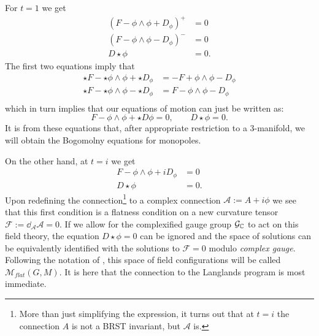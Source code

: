 	For $t = 1$ we get
	\begin{equation}\label{eq:ahat}
		\begin{aligned}
			(F - \phi \wedge \phi + D_\phi)^+ &= 0\\
			(F - \phi \wedge \phi - D_\phi)^- &= 0\\
			D \star \phi &= 0.
		\end{aligned}
	\end{equation}
	The first  two equations imply that
	\[
	\begin{aligned}
		\star F - \star \phi \wedge \phi + \star D_\phi &= - F + \phi \wedge \phi - D_\phi\\
		\star F - \star \phi \wedge \phi - \star D_\phi &= F - \phi \wedge \phi - D_\phi\\
	\end{aligned}		
	\]
	which in turn implies that our equations of motion can just be written as:
	\begin{equation}
		F - \phi \wedge \phi + \star D \phi = 0, \qquad D \star \phi = 0.
	\end{equation}
	It is from these equations that, after appropriate restriction to a 3-manifold, we will obtain the Bogomolny equations for monopoles.
	
	
	On the other hand, at $t=i$ we get
	\begin{equation}\label{eq:bhat}
		\begin{aligned}
			F - \phi \wedge \phi + i D_\phi &= 0\\
			D \star \phi &= 0.
		\end{aligned}
	\end{equation}
	Upon redefining the connection\footnote{More than just simplifying the expression, it turns out that at $t=i$ the connection $A$ is not a BRST invariant, but $\mathcal A$ is.} to a complex connection $\mathcal A := A + i \phi$ we see that this first condition is a flatness condition on a new curvature tensor $\mathcal F := \dd_{\mathcal A} \mathcal A = 0$.  If we allow for the complexified gauge group $\mathcal G_{\mathbb{C}}$ to act on this field theory, the equation $D \star \phi = 0$ can be ignored and the space of solutions can be equivalently identified with the solutions to $\mathcal F = 0$ modulo \emph{complex gauge}. Following the notation of \cite{kapustin2008}, this space of field configurations will be called $\mathcal M_{flat}(G, M)$. It is here that the connection to the Langlands program is most immediate.
	

